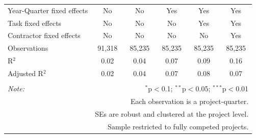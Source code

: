 \documentclass[]{article}
\begin{document}
\begin{table}[H]
\begin{tabular}{@{\extracolsep{-2pt}}lccccc}
Year-Quarter fixed effects & No & No & Yes & Yes & Yes \\ 
Task fixed effects & No & No & No & Yes & Yes \\ 
Contractor fixed effects & No & No & No & No & Yes \\ 
Observations & 91,318 & 85,235 & 85,235 & 85,235 & 85,235 \\ 
R$^{2}$ & 0.02 & 0.04 & 0.07 & 0.09 & 0.16 \\ 
Adjusted R$^{2}$ & 0.02 & 0.04 & 0.07 & 0.08 & 0.07 \\ 
\hline 
\hline \\[-1.8ex] 
\textit{Note:}  & \multicolumn{5}{r}{$^{*}$p$<$0.1; $^{**}$p$<$0.05; $^{***}$p$<$0.01} \\ 
 & \multicolumn{5}{r}{Each observation is a project-quarter.} \\ 
 & \multicolumn{5}{r}{SEs are robust and clustered at the project level.} \\ 
 & \multicolumn{5}{r}{Sample restricted to fully competed projects.} \\ 
\end{tabular} 
\end{table}
\end{document}
